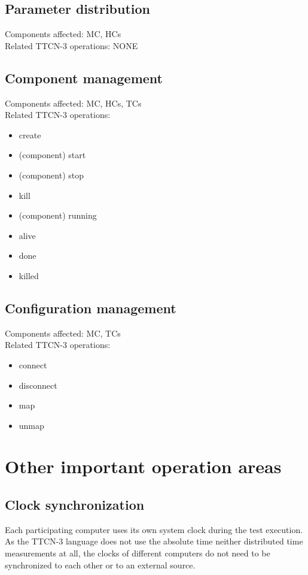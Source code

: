 \documentclass[a4paper,10pt]{article}
\begin{document}
\subsection{Parameter distribution}
Components affected: MC, HCs \\
Related TTCN-3 operations: NONE

\subsection{Component management}
Components affected: MC, HCs, TCs \\
Related TTCN-3 operations:
\begin{itemize}
\item create
\item (component) start
\item (component) stop
\item kill
\item (component) running
\item alive
\item done
\item killed
\end{itemize}

\subsection{Configuration management}
Components affected: MC, TCs \\
Related TTCN-3 operations:
\begin{itemize}
\item connect
\item disconnect
\item map
\item unmap
\end{itemize}

\section{Other important operation areas}

\subsection{Clock synchronization}

Each participating computer uses its own system clock during the test execution. As the TTCN-3 language does not use the absolute time neither distributed time measurements at all, the clocks of different computers do not need to be synchronized to each other or to an external source.
\end{document}
